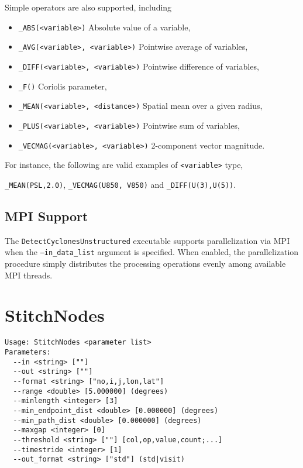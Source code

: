 \documentclass{article}
\begin{document}
Simple operators are also supported, including
\begin{itemize}
\item[] \texttt{\_ABS(<variable>)} Absolute value of a variable,
\item[] \texttt{\_AVG(<variable>, <variable>)} Pointwise average of variables,
\item[] \texttt{\_DIFF(<variable>, <variable>)} Pointwise difference of variables,
\item[] \texttt{\_F()}  Coriolis parameter,
\item[] \texttt{\_MEAN(<variable>, <distance>)} Spatial mean over a given radius,
\item[] \texttt{\_PLUS(<variable>, <variable>)} Pointwise sum of variables,
\item[] \texttt{\_VECMAG(<variable>, <variable>)} 2-component vector magnitude.
\end{itemize}  For instance, the following are valid examples of \texttt{<variable>} type,
\begin{center}
\texttt{\_MEAN(PSL,2.0)}, \quad \texttt{\_VECMAG(U850, V850)} \quad and \quad \texttt{\_DIFF(U(3),U(5))}.
\end{center}

\subsection{MPI Support} \label{sec:VariableSpecification}

The \texttt{DetectCyclonesUnstructured} executable supports parallelization via MPI when the \texttt{--in\_data\_list} argument is specified.  When enabled, the parallelization procedure simply distributes the processing operations evenly among available MPI threads.

\section{StitchNodes}

\begin{verbatim}
Usage: StitchNodes <parameter list>
Parameters:
  --in <string> [""] 
  --out <string> [""] 
  --format <string> ["no,i,j,lon,lat"] 
  --range <double> [5.000000] (degrees)
  --minlength <integer> [3] 
  --min_endpoint_dist <double> [0.000000] (degrees)
  --min_path_dist <double> [0.000000] (degrees)
  --maxgap <integer> [0] 
  --threshold <string> [""] [col,op,value,count;...]
  --timestride <integer> [1] 
  --out_format <string> ["std"] (std|visit)
\end{verbatim}
\end{document}
